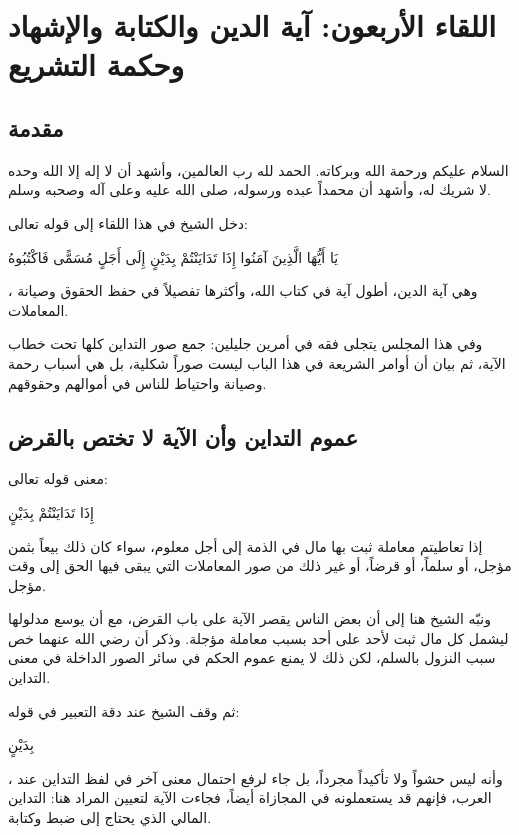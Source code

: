 \chapter{اللقاء الأربعون: آية الدين والكتابة والإشهاد وحكمة التشريع}

\section{مقدمة}
السلام عليكم ورحمة الله وبركاته. الحمد لله رب العالمين، وأشهد أن لا إله إلا الله وحده لا شريك له، وأشهد أن محمداً عبده ورسوله، صلى الله عليه وعلى آله وصحبه وسلم.

دخل الشيخ في هذا اللقاء إلى قوله تعالى: \begin{ayah}يَا أَيُّهَا الَّذِينَ آمَنُوا إِذَا تَدَايَنْتُمْ بِدَيْنٍ إِلَى أَجَلٍ مُسَمًّى فَاكْتُبُوهُ\end{ayah}، وهي آية الدين، أطول آية في كتاب الله، وأكثرها تفصيلاً في حفظ الحقوق وصيانة المعاملات.

وفي هذا المجلس يتجلى فقه  في أمرين جليلين: جمع صور التداين كلها تحت خطاب الآية، ثم بيان أن أوامر الشريعة في هذا الباب ليست صوراً شكلية، بل هي أسباب رحمة وصيانة واحتياط للناس في أموالهم وحقوقهم.

\separator

\section{عموم التداين وأن الآية لا تختص بالقرض}
 معنى قوله تعالى: \begin{ayah}إِذَا تَدَايَنْتُمْ بِدَيْنٍ\end{ayah} إذا تعاطيتم معاملة ثبت بها مال في الذمة إلى أجل معلوم، سواء كان ذلك بيعاً بثمن مؤجل، أو سلماً، أو قرضاً، أو غير ذلك من صور المعاملات التي يبقى فيها الحق إلى وقت مؤجل.

ونبّه الشيخ هنا إلى أن بعض الناس يقصر الآية على باب القرض، مع أن  يوسع مدلولها ليشمل كل مال ثبت لأحد على أحد بسبب معاملة مؤجلة. وذكر أن  رضي الله عنهما خص سبب النزول بالسلم، لكن ذلك لا يمنع عموم الحكم في سائر الصور الداخلة في معنى التداين.

ثم وقف الشيخ عند دقة التعبير في قوله: \begin{ayah}بِدَيْنٍ\end{ayah}، وأنه ليس حشواً ولا تأكيداً مجرداً، بل جاء لرفع احتمال معنى آخر في لفظ التداين عند العرب، فإنهم قد يستعملونه في المجازاة أيضاً، فجاءت الآية لتعيين المراد هنا: التداين المالي الذي يحتاج إلى ضبط وكتابة.

